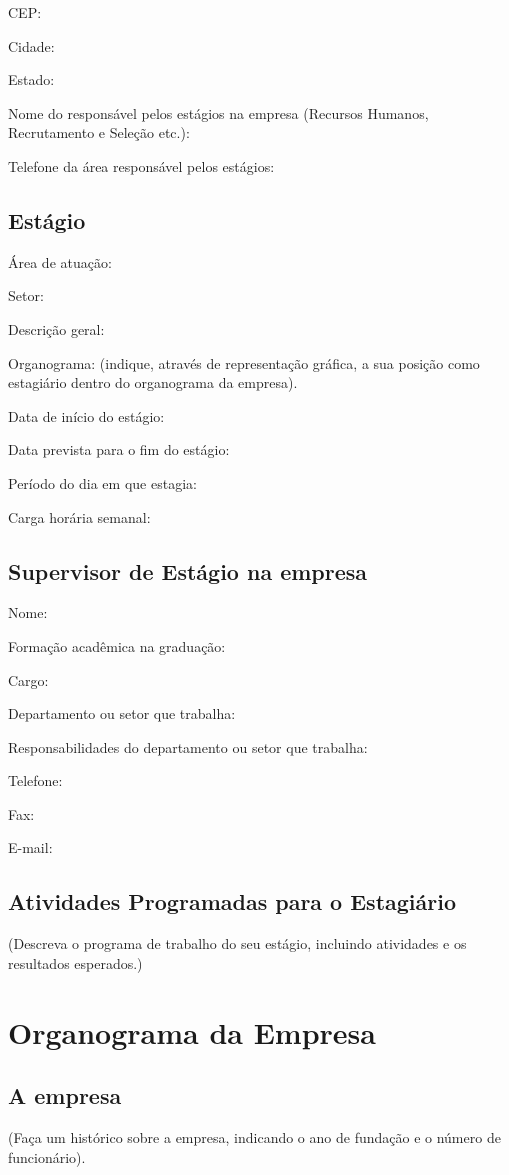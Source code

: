 \documentclass[
	12pt,				%
	openright,			%
	oneside,			%
	a4paper,			%
	english,			%
	french,				%
	spanish,			%
	brazil				%
	]{abntex2}
\begin{document}
CEP:

Cidade:

Estado:

Nome do responsável pelos estágios na empresa (Recursos Humanos, Recrutamento e Seleção etc.):

Telefone da área responsável pelos estágios:

\section{Estágio}
Área de atuação:

Setor:

Descrição geral:

Organograma: (indique, através de representação gráfica, a sua posição como estagiário dentro do organograma da empresa).

Data de início do estágio:

Data prevista para o fim do estágio:

Período do dia em que estagia:

Carga horária semanal:
\section{Supervisor de Estágio na empresa}
Nome:

Formação acadêmica na graduação:

Cargo:

Departamento ou setor que trabalha:

Responsabilidades do departamento ou setor que trabalha:

Telefone:

Fax:

E-mail:

\section{Atividades Programadas para o Estagiário}
(Descreva o programa de trabalho do seu estágio, incluindo atividades e os resultados esperados.)

\chapter[Organograma da Empresa]{Organograma da Empresa}

\section{A empresa}
(Faça um histórico sobre a empresa, indicando o ano de fundação e o número de
funcionário).
\end{document}
